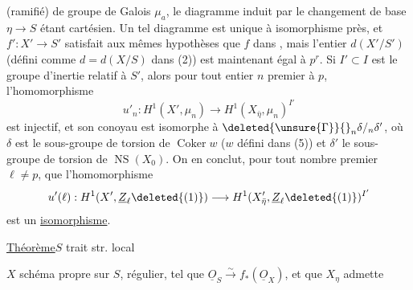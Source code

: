 

  (ramifié) de  groupe de Galois $\mu_a$, le diagramme  induit par le changement de base $\eta\longrightarrow S$ étant cartésien. Un tel diagramme est unique à isomorphisme près,  et $f':X'\longrightarrow S'$ satisfait aux mêmes hypothèses  que $f$ dans \qquad, mais l'entier $d(X'/S')$ (défini comme $d=d(X/S)$ dans (2)) est maintenant  égal à $p^r$.
Si $I'\subset I$ est le groupe d'inertie  relatif à $S'$, alors pour tout entier $n$ premier à $p$, l'homomorphisme
\[
u'_n:H^1(X',\mu_n)\longrightarrow H^1(X_{\bar\eta},\mu_n)^{I'}
\]
est injectif, et son conoyau est isomorphe à $\deleted{\unsure{\Gamma}}{}_n\delta/{}_n\delta'$, où $\delta$ est le sous-groupe de torsion de $\operatorname{Coker}w$ ($w$ défini dans (5)) et $\delta'$ le sous-groupe de torsion de $\operatorname{NS}(X_0)$. On en conclut, pour tout nombre premier $\ell\neq p$,  que l'homomorphisme
\[
u'(\ell):H^1(X',\underline Z_\ell\deleted{(1)})\longrightarrow H^1(X'_{\bar\eta},\underline Z_\ell\deleted{(1)})^{I'}
\]
est un \uline{isomorphisme}.

\margin{$\times\quad\times\quad\times$}


\uline{Théorème}\quad $S$ trait str. local

$X$ schéma propre sur $S$, régulier, tel que $\underline O_S\xrightarrow{\sim}f_*(\underline O_X)$, et que $X_\eta$ admette 


